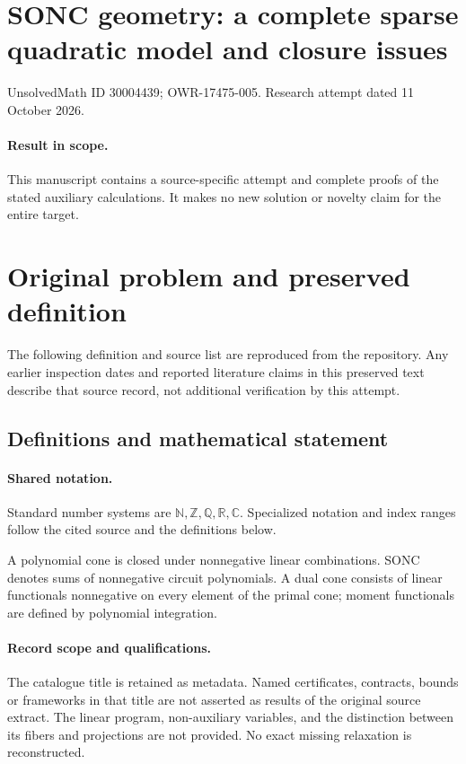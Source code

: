 \documentclass[11pt]{article}
\begin{document}
\section*{SONC geometry: a complete sparse quadratic model and closure issues}
\noindent UnsolvedMath ID 30004439; OWR-17475-005. Research attempt dated 11 October 2026.
\paragraph{Result in scope.}This manuscript contains a source-specific attempt and complete proofs of the stated auxiliary calculations. It makes no new solution or novelty claim for the entire target.
\section{Original problem and preserved definition}
The following definition and source list are reproduced from the repository. Any earlier inspection dates and reported literature claims in this preserved text describe that source record, not additional verification by this attempt.
\subsection{Definitions and mathematical statement}

\paragraph{Shared notation.}Standard number systems are $\mathbb N,\mathbb Z,\mathbb Q,\mathbb R,\mathbb C$. Specialized notation and index ranges follow the cited source and the definitions below.


A polynomial cone is closed under nonnegative linear combinations. SONC denotes sums of nonnegative circuit polynomials. A dual cone consists of linear functionals nonnegative on every element of the primal cone; moment functionals are defined by polynomial integration.
\paragraph{Record scope and qualifications.}
The catalogue title is retained as metadata. Named certificates, contracts, bounds or frameworks in that title are not asserted as results of the original source extract.
The linear program, non-auxiliary variables, and the distinction between its fibers and projections are not provided. No exact missing relaxation is reconstructed.
\end{document}
